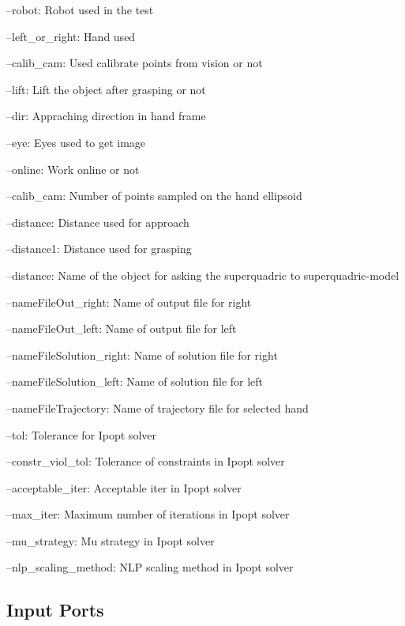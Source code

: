 \begin{DoxyItemize}
\item --robot\-: Robot used in the test
\item --left\-\_\-or\-\_\-right\-: Hand used
\item --calib\-\_\-cam\-: Used calibrate points from vision or not
\item --lift\-: Lift the object after grasping or not
\item --dir\-: Appraching direction in hand frame
\item --eye\-: Eyes used to get image
\item --online\-: Work online or not
\item --calib\-\_\-cam\-: Number of points sampled on the hand ellipsoid
\item --distance\-: Distance used for approach
\item --distance1\-: Distance used for grasping
\item --distance\-: Name of the object for asking the superquadric to superquadric-\/model
\item --name\-File\-Out\-\_\-right\-: Name of output file for right
\item --name\-File\-Out\-\_\-left\-: Name of output file for left
\item --name\-File\-Solution\-\_\-right\-: Name of solution file for right
\item --name\-File\-Solution\-\_\-left\-: Name of solution file for left
\item --name\-File\-Trajectory\-: Name of trajectory file for selected hand
\item --tol\-: Tolerance for Ipopt solver
\item --constr\-\_\-viol\-\_\-tol\-: Tolerance of constraints in Ipopt solver
\item --acceptable\-\_\-iter\-: Acceptable iter in Ipopt solver
\item --max\-\_\-iter\-: Maximum number of iterations in Ipopt solver
\item --mu\-\_\-strategy\-: Mu strategy in Ipopt solver
\item --nlp\-\_\-scaling\-\_\-method\-: N\-L\-P scaling method in Ipopt solver 
\end{DoxyItemize}\hypertarget{group__superquadric-grasping_inputports_sec}{}\subsection{Input Ports}\label{group__superquadric-grasping_inputports_sec}

